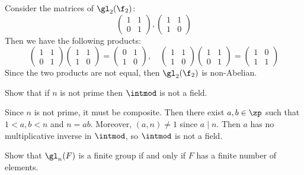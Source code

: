 \begin{sol}
    Consider the matrices of $\gl_2(\f_2)$:
    \[
    \begin{pmatrix}
        1 & 1 \\
        0 & 1
    \end{pmatrix}, 
    \begin{pmatrix}
        1 & 1 \\
        1 & 0
    \end{pmatrix}
    \]
    Then we have the following products:
    \[
    \begin{pmatrix}
        1 & 1 \\
        0 & 1
    \end{pmatrix}
    \begin{pmatrix}
        1 & 1 \\
        1 & 0
    \end{pmatrix} = 
    \begin{pmatrix}
        0 & 1 \\
        1 & 0
    \end{pmatrix}, \quad
    \begin{pmatrix}
        1 & 1 \\
        1 & 0
    \end{pmatrix}
    \begin{pmatrix}
        1 & 1 \\
        0 & 1
    \end{pmatrix} = 
    \begin{pmatrix}
        1 & 0 \\
        1 & 1
    \end{pmatrix}
    \]
    Since the two products are not equal, then $\gl_2(\f_2)$ is non-Abelian.
\end{sol}

\begin{exercise}\label{ex1.4.4}
    Show that if $n$ is not prime then $\intmod$ is not a field.
\end{exercise}

\begin{sol}
    Since $n$ is not prime, it must be composite. Then there exist $a, b \in \zp$ such that $1 < a, b < n$ and $n = ab$. Moreover, $(a, n) \neq 1$ since $a \mid n$. Then $a$ has no multiplicative inverse in $\intmod$, so $\intmod$ is not a field.
\end{sol}

\newpage

\begin{exercise}\label{ex1.4.5}
    Show that $\gl_n(F)$ is a finite group if and only if $F$ has a finite number of elements.
\end{exercise}

